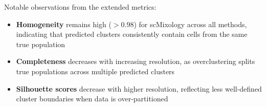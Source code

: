 Notable observations from the extended metrics:
\begin{itemize}[noitemsep]
    \item \textbf{Homogeneity} remains high ($>0.98$) for scMixology across all methods, indicating that predicted clusters consistently contain cells from the same true population
    \item \textbf{Completeness} decreases with increasing resolution, as overclustering splits true populations across multiple predicted clusters
    \item \textbf{Silhouette scores} decrease with higher resolution, reflecting less well-defined cluster boundaries when data is over-partitioned
\end{itemize}
